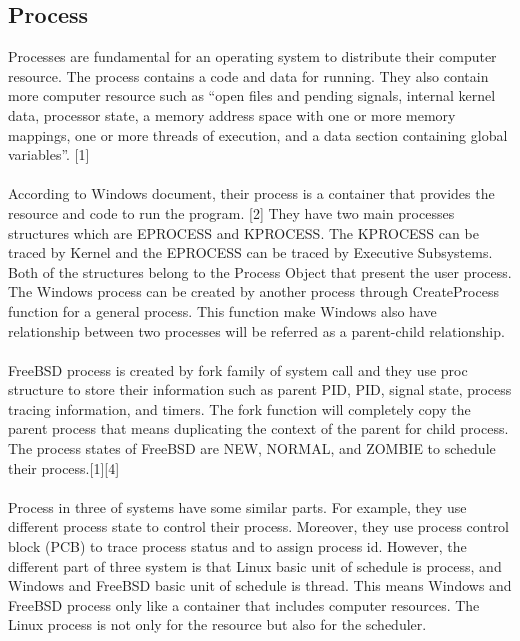 \documentclass[letterpaper,draftclsnofoot,journal,compsoc,10pt,onecolumn]{IEEEtran}
\begin{document}
\subsection{Process}
\indent Processes are fundamental for an operating system to distribute their computer resource. The process contains a code and data for running. They also contain more computer resource such as “open files and pending signals, internal kernel data, processor state, a memory address space with one or more memory mappings, one or more threads of execution, and a data section containing global variables”. [1] 
\\\\
\indent According to Windows document, their process is a container that provides the resource and code to run the program. [2] They have two main processes structures which are EPROCESS and KPROCESS. The KPROCESS can be traced by Kernel and the EPROCESS can be traced by Executive Subsystems. Both of the structures belong to the Process Object that present the user process. The Windows process can be created by another process through CreateProcess function for a general process. This function make Windows also have relationship between two processes will be referred as a parent-child relationship. 
\\\\
\indent FreeBSD process is created by fork family of system call and they use proc structure to store their information such as parent PID, PID, signal state, process tracing information, and timers. The fork function will completely copy the parent process that means duplicating the context of the parent for child process. The process states of FreeBSD are NEW, NORMAL, and ZOMBIE to schedule their process.[1][4]
\\\\
\indent Process in three of systems have some similar parts. For example, they use different process state to control their process. Moreover, they use process control block (PCB) to trace process status and to assign process id. However, the different part of three system is that Linux basic unit of schedule is process, and Windows and FreeBSD basic unit of schedule is thread. This means Windows and FreeBSD process only like a container that includes computer resources. The Linux process is not only for the resource but also for the scheduler.
\end{document}
